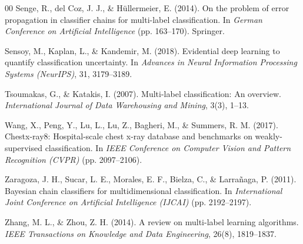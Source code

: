 \documentclass[1p,times]{elsarticle}
\begin{document}
\begin{thebibliography}{00}
Senge, R., del Coz, J. J., \& H{\"u}llermeier, E. (2014).
On the problem of error propagation in classifier chains for multi-label classification.
In \textit{German Conference on Artificial Intelligence} (pp. 163--170). Springer.

Sensoy, M., Kaplan, L., \& Kandemir, M. (2018).
Evidential deep learning to quantify classification uncertainty.
In \textit{Advances in Neural Information Processing Systems (NeurIPS)}, 31, 3179--3189.

Tsoumakas, G., \& Katakis, I. (2007).
Multi-label classification: An overview.
\textit{International Journal of Data Warehousing and Mining}, 3(3), 1--13.

Wang, X., Peng, Y., Lu, L., Lu, Z., Bagheri, M., \& Summers, R. M. (2017).
Chestx-ray8: Hospital-scale chest x-ray database and benchmarks on weakly-supervised classification.
In \textit{IEEE Conference on Computer Vision and Pattern Recognition (CVPR)} (pp. 2097--2106).

Zaragoza, J. H., Sucar, L. E., Morales, E. F., Bielza, C., \& Larra{\~n}aga, P. (2011).
Bayesian chain classifiers for multidimensional classification.
In \textit{International Joint Conference on Artificial Intelligence (IJCAI)} (pp. 2192--2197).

Zhang, M. L., \& Zhou, Z. H. (2014).
A review on multi-label learning algorithms.
\textit{IEEE Transactions on Knowledge and Data Engineering}, 26(8), 1819--1837.

\end{thebibliography}
\end{document}
